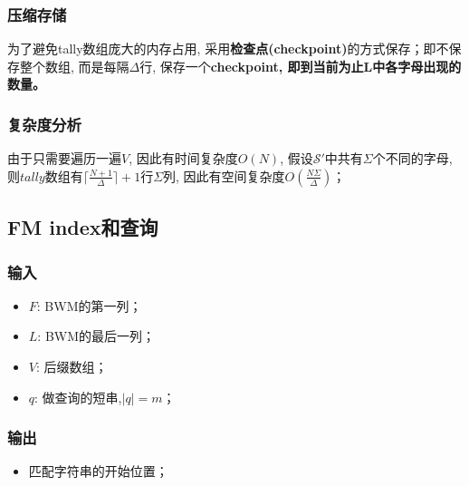 \documentclass[UTF8]{ctexart}
\begin{document}
    \subsubsection{压缩存储}
    为了避免tally数组庞大的内存占用, 采用\textbf{检查点(checkpoint)}的方式保存；即不保存整个数组, 而是每隔$\Delta$行, 保存一个\textbf{checkpoint, 即到当前为止L中各字母出现的数量。}

    \subsubsection{复杂度分析}
    由于只需要遍历一遍$V$, 因此有时间复杂度$O(N)$, 假设$\mathcal{S'}$中共有$\Sigma$个不同的字母,则$tally$数组有$\lceil\frac{N+1}{\Delta}\rceil + 1$行$\Sigma$列, 因此有空间复杂度$O(\frac{N\Sigma}{\Delta})$；
    
    \subsection{FM index和查询}
    \subsubsection{输入}
    \begin{itemize}
        \item $F$: BWM的第一列；
        \item $L$: BWM的最后一列；
        \item $V$: 后缀数组；
        \item $q$: 做查询的短串,$|q| = m$；
    \end{itemize}
    \subsubsection{输出}
    \begin{itemize}
        \item 匹配字符串的开始位置；
    \end{itemize}
\end{document}
